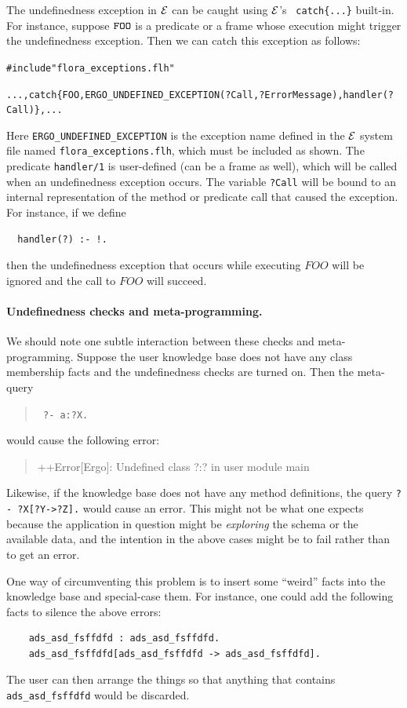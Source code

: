 \documentclass[11pt]{article}
\newcommand{\ERGO}{\mbox{\ensuremath{\cal{E}}\smaller{{\sc{RGO}}}}\xspace}
\newcommand{\FLSYSTEM}{\ERGO}
\newcommand{\FLUNDEFEXCEPTION}{ERGO\_UNDEFINED\_EXCEPTION}
\newcommand{\errorsystem}{Ergo}
\begin{document}
The undefinedness exception in \FLSYSTEM can be caught using \FLSYSTEM's {\tt
  catch\{...\}} built-in. For instance, suppose
$\tt FOO$ is a predicate or a frame whose execution might trigger the
undefinedness exception. Then we can catch this exception as follows:
\begin{alltt}
#include "flora_exceptions.flh"

  ..., catch\{FOO, {\smaller\FLUNDEFEXCEPTION}(?Call,?ErrorMessage), handler(?Call)\}, ...
\end{alltt}
Here \texttt{\FLUNDEFEXCEPTION} is the exception name defined in the
\FLSYSTEM system file named {\tt flora\_exceptions.flh}, which must be included as
shown.
The predicate {\tt handler/1} is user-defined (can be a frame as well),
which will be called when an undefinedness exception occurs. The variable
{\tt ?Call} will be bound to an internal representation of the method or
predicate call that caused the exception. For instance, if we define
\begin{verbatim}
  handler(?) :- !.  
\end{verbatim}
then the undefinedness exception that occurs while executing $FOO$ will be
ignored and the call to $FOO$ will succeed.


\paragraph{Undefinedness checks and meta-programming.}
We should note one subtle interaction between these checks and
meta-programming. Suppose the user knowledge base does not have any class membership
facts and the undefinedness checks are turned on. Then the meta-query
\begin{quote}
 {\tt
       ?- a:?X.
 }
\end{quote}
would cause the following error:
\begin{quote}
 ++Error[\errorsystem]: Undefined class ?:? in user module main  
\end{quote}
Likewise, if the knowledge base does not have any method definitions,
the query {\tt ?- ?X[?Y->?Z].} would cause an error. This might not
be what one expects because the application in question might be
\emph{exploring} the schema or the available data, and the intention in the
above cases might be to fail rather than to get an error.

One way of circumventing this problem is to insert some ``weird''
facts into the
knowledge base and special-case them. For instance, one could add
the following facts to silence the above errors:
\begin{verbatim}
    ads_asd_fsffdfd : ads_asd_fsffdfd.
    ads_asd_fsffdfd[ads_asd_fsffdfd -> ads_asd_fsffdfd].
\end{verbatim}
The user can then arrange the things so that anything that contains
{\tt ads\_asd\_fsffdfd} would be discarded.
\end{document}
